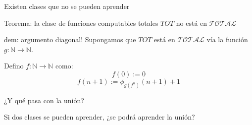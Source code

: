 \documentclass[10pt]{beamer}
\begin{document}
\begin{frame}{Existen clases que no se pueden aprender}


	Teorema: la clase de funciones computables totales $TOT$ no está en $\mathcal{TOTAL}$
	
	dem: argumento diagonal! Supongamos que $TOT$ está en $\mathcal{TOTAL}$ vía la función $g : \mathbb{N} \rightarrow \mathbb{N}$.
	
	Defino $f : \mathbb{N} \rightarrow \mathbb{N}$ como:
	$$f(0):=0$$
	$$f(n+1) := \phi_{g(f^n)}(n+1) + 1$$
	
	
	
	
	


\end{frame}


\begin{frame}{¿Y qué pasa con la unión?}

Si dos clases se pueden aprender, ¿se podrá aprender la unión?














\end{frame}



\end{document}
